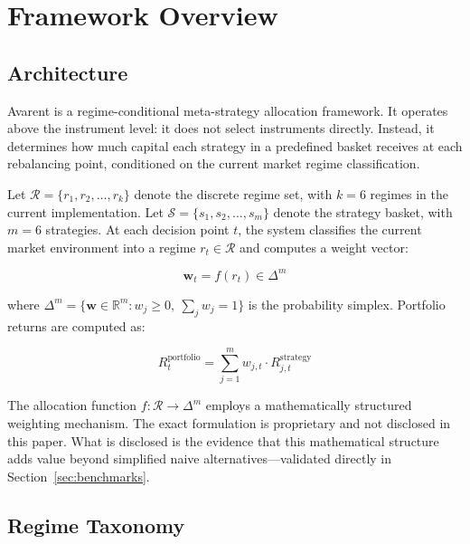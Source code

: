 \documentclass[12pt]{article}
\begin{document}
\section{Framework Overview}

\subsection{Architecture}

Avarent is a regime-conditional meta-strategy allocation framework.
It operates above the instrument level: it does not select instruments directly.
Instead, it determines how much capital each strategy in a predefined basket receives at each rebalancing point, conditioned on the current market regime classification.

Let $\mathcal{R} = \{r_1, r_2, \ldots, r_k\}$ denote the discrete regime set, with $k = 6$ regimes in the current implementation.
Let $\mathcal{S} = \{s_1, s_2, \ldots, s_m\}$ denote the strategy basket, with $m = 6$ strategies.
At each decision point $t$, the system classifies the current market environment into a regime $r_t \in \mathcal{R}$ and computes a weight vector:

\begin{equation}
    \mathbf{w}_t = f(r_t) \in \Delta^m
    \label{eq:allocation}
\end{equation}

\noindent
where $\Delta^m = \{\mathbf{w} \in \mathbb{R}^m : w_j \geq 0,\ \sum_j w_j = 1\}$ is the probability simplex.
Portfolio returns are computed as:

\begin{equation}
    R_t^{\text{portfolio}} = \sum_{j=1}^{m} w_{j,t} \cdot R_{j,t}^{\text{strategy}}
    \label{eq:portfolio}
\end{equation}

The allocation function $f: \mathcal{R} \to \Delta^m$ employs a mathematically structured weighting mechanism.
The exact formulation is proprietary and not disclosed in this paper.
What is disclosed is the evidence that this mathematical structure adds value beyond simplified naive alternatives---validated directly in Section~\ref{sec:benchmarks}.

\subsection{Regime Taxonomy}
\end{document}

